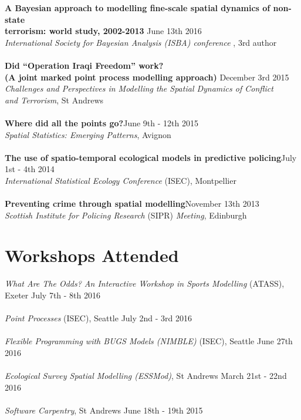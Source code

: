 \documentclass[10pt,letter]{res}
\begin{document}
\begin{resume}
{\textbf {A Bayesian approach to modelling fine-scale spatial dynamics of non-state\\
 terrorism: world study, 2002-2013 }}\hfill June 13th 2016\\
 {\sl International Society for Bayesian Analysis (ISBA) conference }, 3rd author\\
 \hdashrule[0.5ex]{4cm}{1pt}{1pt}\\
 {\textbf{Did ``Operation Iraqi Freedom'' work? \\
(A joint marked point process modelling approach) }}\hfill December 3rd 2015\\
 {\sl Challenges and Perspectives in Modelling the Spatial Dynamics of Conflict\\ and Terrorism}, St Andrews\\
 \hdashrule[0.5ex]{4cm}{1pt}{1pt}\\
{\textbf{Where did all the points go?}}\hfill June 9th - 12th 2015\\
 {\sl Spatial Statistics: Emerging Patterns}, Avignon\\
\hdashrule[0.5ex]{4cm}{1pt}{1pt}\\
 {\textbf{The use of spatio-temporal ecological models in predictive policing}}\hfill July 1st - 4th 2014\\
 {\sl International Statistical Ecology Conference} (ISEC), Montpellier\\
 \hdashrule[0.5ex]{4cm}{1pt}{1pt}\\
{\textbf{Preventing crime through spatial modelling}}\hfill November 13th 2013\\
 {\sl Scottish Institute for Policing Research} (SIPR) {\sl Meeting}, Edinburgh\\
 

\vspace{-2mm}
\newpage

\section{Workshops Attended}
\vspace{1mm}
{\sl What Are The Odds? An Interactive Workshop in Sports Modelling} (ATASS), Exeter \hfill July 7th - 8th 2016\\
\hdashrule[0.5ex]{4cm}{1pt}{1pt}\\
{\sl Point Processes} (ISEC), Seattle \hfill July 2nd - 3rd 2016\\
\hdashrule[0.5ex]{4cm}{1pt}{1pt}\\
{\sl Flexible Programming with BUGS Models (NIMBLE)} (ISEC), Seattle \hfill June 27th 2016\\
\hdashrule[0.5ex]{4cm}{1pt}{1pt}\\
{\sl Ecological Survey Spatial Modelling (ESSMod)}, St Andrews \hfill March 21st - 22nd 2016\\
 \hdashrule[0.5ex]{4cm}{1pt}{1pt}\\
 {\sl Software Carpentry}, St Andrews \hfill June 18th - 19th 2015\\
 

\end{resume}
\end{document}
